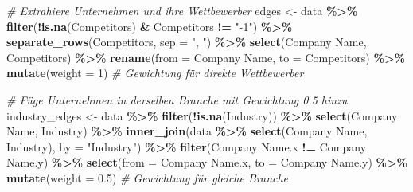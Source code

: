 \documentclass[
]{article}
\newenvironment{Shaded}{\begin{snugshade}}{\end{snugshade}}
\newcommand{\AttributeTok}[1]{\textcolor[rgb]{0.13,0.29,0.53}{#1}}
\newcommand{\CommentTok}[1]{\textcolor[rgb]{0.56,0.35,0.01}{\textit{#1}}}
\newcommand{\DecValTok}[1]{\textcolor[rgb]{0.00,0.00,0.81}{#1}}
\newcommand{\FloatTok}[1]{\textcolor[rgb]{0.00,0.00,0.81}{#1}}
\newcommand{\FunctionTok}[1]{\textcolor[rgb]{0.13,0.29,0.53}{\textbf{#1}}}
\newcommand{\NormalTok}[1]{#1}
\newcommand{\OtherTok}[1]{\textcolor[rgb]{0.56,0.35,0.01}{#1}}
\newcommand{\SpecialCharTok}[1]{\textcolor[rgb]{0.81,0.36,0.00}{\textbf{#1}}}
\newcommand{\StringTok}[1]{\textcolor[rgb]{0.31,0.60,0.02}{#1}}
\begin{document}
\begin{Shaded}
\begin{Highlighting}[]
\CommentTok{\# Extrahiere Unternehmen und ihre Wettbewerber}
\NormalTok{edges }\OtherTok{\textless{}{-}}\NormalTok{ data }\SpecialCharTok{\%\textgreater{}\%}
  \FunctionTok{filter}\NormalTok{(}\SpecialCharTok{!}\FunctionTok{is.na}\NormalTok{(Competitors) }\SpecialCharTok{\&}\NormalTok{ Competitors }\SpecialCharTok{!=} \StringTok{"{-}1"}\NormalTok{) }\SpecialCharTok{\%\textgreater{}\%}
  \FunctionTok{separate\_rows}\NormalTok{(Competitors, }\AttributeTok{sep =} \StringTok{", "}\NormalTok{) }\SpecialCharTok{\%\textgreater{}\%}
  \FunctionTok{select}\NormalTok{(}\StringTok{\textasciigrave{}}\AttributeTok{Company Name}\StringTok{\textasciigrave{}}\NormalTok{, Competitors) }\SpecialCharTok{\%\textgreater{}\%}
  \FunctionTok{rename}\NormalTok{(}\AttributeTok{from =} \StringTok{\textasciigrave{}}\AttributeTok{Company Name}\StringTok{\textasciigrave{}}\NormalTok{, }\AttributeTok{to =}\NormalTok{ Competitors) }\SpecialCharTok{\%\textgreater{}\%}
  \FunctionTok{mutate}\NormalTok{(}\AttributeTok{weight =} \DecValTok{1}\NormalTok{)  }\CommentTok{\# Gewichtung für direkte Wettbewerber}

\CommentTok{\# Füge Unternehmen in derselben Branche mit Gewichtung 0.5 hinzu}
\NormalTok{industry\_edges }\OtherTok{\textless{}{-}}\NormalTok{ data }\SpecialCharTok{\%\textgreater{}\%}
  \FunctionTok{filter}\NormalTok{(}\SpecialCharTok{!}\FunctionTok{is.na}\NormalTok{(Industry)) }\SpecialCharTok{\%\textgreater{}\%}
  \FunctionTok{select}\NormalTok{(}\StringTok{\textasciigrave{}}\AttributeTok{Company Name}\StringTok{\textasciigrave{}}\NormalTok{, Industry) }\SpecialCharTok{\%\textgreater{}\%}
  \FunctionTok{inner\_join}\NormalTok{(data }\SpecialCharTok{\%\textgreater{}\%} \FunctionTok{select}\NormalTok{(}\StringTok{\textasciigrave{}}\AttributeTok{Company Name}\StringTok{\textasciigrave{}}\NormalTok{, Industry), }\AttributeTok{by =} \StringTok{"Industry"}\NormalTok{) }\SpecialCharTok{\%\textgreater{}\%}
  \FunctionTok{filter}\NormalTok{(}\StringTok{\textasciigrave{}}\AttributeTok{Company Name.x}\StringTok{\textasciigrave{}} \SpecialCharTok{!=} \StringTok{\textasciigrave{}}\AttributeTok{Company Name.y}\StringTok{\textasciigrave{}}\NormalTok{) }\SpecialCharTok{\%\textgreater{}\%}
  \FunctionTok{select}\NormalTok{(}\AttributeTok{from =} \StringTok{\textasciigrave{}}\AttributeTok{Company Name.x}\StringTok{\textasciigrave{}}\NormalTok{, }\AttributeTok{to =} \StringTok{\textasciigrave{}}\AttributeTok{Company Name.y}\StringTok{\textasciigrave{}}\NormalTok{) }\SpecialCharTok{\%\textgreater{}\%}
  \FunctionTok{mutate}\NormalTok{(}\AttributeTok{weight =} \FloatTok{0.5}\NormalTok{)  }\CommentTok{\# Gewichtung für gleiche Branche}
\end{Highlighting}
\end{Shaded}
\end{document}
